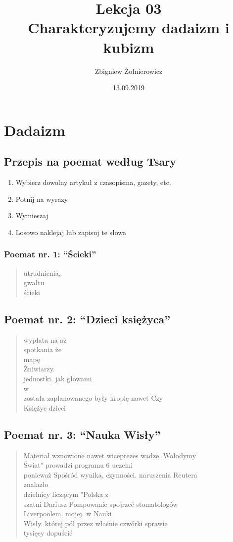\documentclass[a4paper]{article}
\begin{document}
\title{{\huge Lekcja 03} \\
{\large Charakteryzujemy dadaizm i kubizm}}
\author{Zbigniew Żołnierowicz}
\date{13.09.2019}
\maketitle
\section{Dadaizm}
\subsection{Przepis na poemat według Tsary}
\begin{enumerate}
    \item Wybierz dowolny artykuł z czasopisma, gazety, etc.
    \item Potnij na wyrazy
    \item Wymieszaj
    \item Losowo naklejaj lub zapisuj te słowa
\end{enumerate}
\subsubsection{Poemat nr. 1: ``Ścieki''}
\begin{quote}
utrudnienia, \\
gwałtu \\
ścieki \\
\end{quote}
\subsection{Poemat nr. 2: ``Dzieci księżyca''}
\begin{quote}
wypłata na aż \\
spotkania że \\
mapę \\
Żniwiarzy. \\
jednostki. jak głowami \\
w \\
została zaplanowanego były kroplę nawet Czy \\
Księżyc dzieci
\end{quote}
\pagebreak
\subsection{Poemat nr. 3: ``Nauka Wisły''}
\begin{quote}
Materiał wznowione nawet wiceprezes wadze, Wołodymy \\
Świat" prowadzi programu 6 uczelni \\
ponieważ Spośród wynika, czynności. naruszenia Reutera \\
znalazło \\
dzielnicy liczącym "Polska z \\
szatni Dariusz Pompowanie spojrzeć stomatologów \\
Liverpoolem. mojej. w Nauki \\
Wisły. której pół przez właśnie czwórki sprawie \\
tysięcy dopuścić \\
\end{quote}
\end{document}
